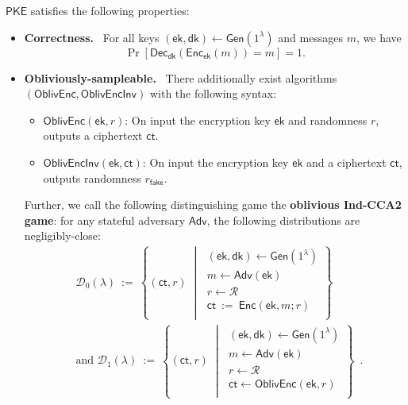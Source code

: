 \documentclass[11pt,letterpaper]{article}
\renewcommand{\emph}[1]{\textbf{#1}~}
\theoremstyle{plain} %
\theoremstyle{definition} %
\theoremstyle{remark} %
\newcommand{\eqdef}{\ {:=} \ }
\newcommand{\SecParam}{\lambda}
\newcommand{\PKE}{\mathsf{PKE}}
\newcommand{\Gen}{\mathsf{Gen}}
\newcommand{\Enc}{\mathsf{Enc}}
\newcommand{\OblivEnc}{\mathsf{OblivEnc}}
\newcommand{\OblivEncInv}{\mathsf{OblivEncInv}}
\newcommand{\Dec}{\mathsf{Dec}}
\newcommand{\EncKey}{\mathsf{ek}}
\newcommand{\DecKey}{\mathsf{dk}}
\newcommand{\Msg}{m}
\newcommand{\Ct}{\mathsf{ct}}
\newcommand{\Rand}{r}
\newcommand{\FakeRand}{r_{\mathsf{fake}}}
\newcommand{\Distribution}{\mathcal{D}}
\newcommand{\RandSpace}{\mathcal{R}}
\newcommand{\Adversary}{{\mathsf{Adv}}} %
\newcommand{\pST}{\; \middle| \;}
\begin{document}
$\PKE$ satisfies the following properties:
\begin{itemize}
    \item \emph{Correctness.} For all keys $(\EncKey, \DecKey) \gets \Gen(1^{\SecParam})$ and messages $\Msg$, we have
    \[ \Pr[ \Dec_{\DecKey} (\Enc_{\EncKey} (\Msg)) = \Msg ] = 1. \]

    \item \emph{Obliviously-sampleable.} There additionally exist algorithms $(\OblivEnc, \OblivEncInv)$ with the following syntax:
    \begin{itemize}
    	\item $\OblivEnc(\EncKey,\Rand)$: On input the encryption key $\EncKey$ and randomness $\Rand$, outputs a ciphertext $\Ct$.
    	\item $\OblivEncInv(\EncKey,\Ct)$: On input the encryption key $\EncKey$ and a ciphertext $\Ct$, outputs randomness $\FakeRand$.
    \end{itemize}

    Further, we call the following distinguishing game the \textbf{oblivious Ind-CCA2 game}: for any stateful adversary $\Adversary$, the following distributions are negligibly-close:
    \begin{align*}
		&\Distribution_0(\SecParam) \eqdef \left\{
		(\Ct,\Rand)
		\pST
		\begin{array}{r}
            (\EncKey,\DecKey)\gets \Gen(1^\SecParam)\\
			\Msg \gets \Adversary(\EncKey)\\
            \Rand \gets \RandSpace\\
			\Ct \eqdef \Enc(\EncKey,\Msg;\Rand)\\
		\end{array}
		\right\} \\
		&\text{and } \Distribution_1(\SecParam) \eqdef \left\{
		(\Ct, \Rand)
		\pST
		\begin{array}{r}
            (\EncKey,\DecKey)\gets \Gen(1^\SecParam)\\
            \Msg \gets \Adversary(\EncKey)\\
            \Rand \gets \RandSpace\\
            \Ct \gets \OblivEnc(\EncKey,\Rand)\\
		\end{array}
		\right\} \enspace.
	\end{align*}
\end{itemize}
\end{document}
